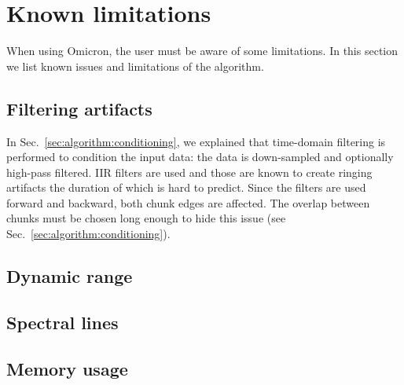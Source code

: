 \section{Known limitations} \label{sec:limitations}

When using Omicron, the user must be aware of some limitations. In this section we list known issues and limitations of the algorithm.

\subsection{Filtering artifacts} \label{sec:limitations:filtering}
In Sec.~\ref{sec:algorithm:conditioning}, we explained that time-domain filtering is performed to condition the input data: the data is down-sampled and optionally high-pass filtered. IIR filters are used and those are known to create ringing artifacts the duration of which is hard to predict. Since the filters are used forward and backward, both chunk edges are affected. The overlap between chunks must be chosen long enough to hide this issue (see Sec.~\ref{sec:algorithm:conditioning}).

\subsection{Dynamic range} \label{sec:limitations:dynamic}


\subsection{Spectral lines} \label{sec:limitations:dynamic}


\subsection{Memory usage} \label{sec:limitations:memory}
